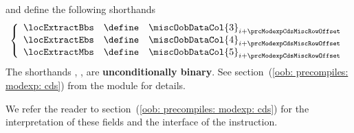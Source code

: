 \begin{description}
\begin{description}
\[{					}
				\]
				and define the following shorthands
				\[
					\left\{ \begin{array}{lclc}
						\locExtractBbs & \define & \miscOobDataCol {3} _{i + \prcModexpCdsMiscRowOffset} \\
						\locExtractEbs & \define & \miscOobDataCol {4} _{i + \prcModexpCdsMiscRowOffset} \\
						\locExtractMbs & \define & \miscOobDataCol {5} _{i + \prcModexpCdsMiscRowOffset} \\
					\end{array} \right.
				\]
				\saNote{} \label{hub: instruction handling: call: precompiles: modexp: common constraints: extract bbs ebs and mbs OOB shorthands are binary}
				The shorthands
				\locExtractBbs{},
				\locExtractEbs{},
				\locExtractMbs{}
				are \textbf{unconditionally binary}.
				See section~(\ref{oob: precompiles: modexp: cds})
				from the \oobMod{} module for details.
		\end{description}
\end{description}
We refer the reader to section~(\ref{oob: precompiles: modexp: cds}) for the interpretation of these fields and the interface of the \oobInstModexpCds{} instruction. 

